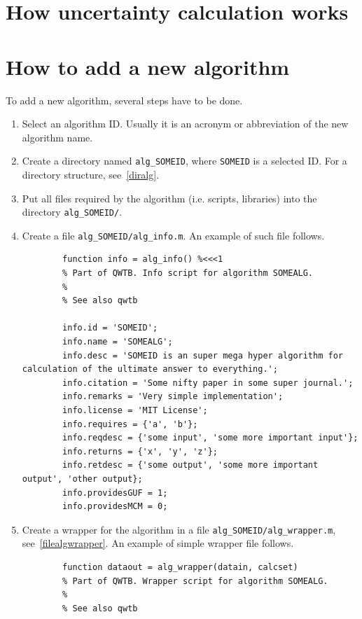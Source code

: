 \documentclass[12pt,a4paper,oneside]{report} %
\begin{document}
\section{How uncertainty calculation works} %

\section{How to add a new algorithm} %
To add a new algorithm, several steps have to be done.

\begin{enumerate}
        \item Select an algorithm ID. Usually it is an acronym or abbreviation of the new algorithm name.

        \item Create a directory named {\tt alg\_SOMEID}, where {\tt SOMEID} is a selected ID. For a
        directory structure, see~\ref{diralg}.

        \item Put all files required by the algorithm (i.e. scripts, libraries) into the directory
        {\tt alg\_SOMEID/}.

        \item Create a file {\tt alg\_SOMEID/alg\_info.m}. An example of such file follows.
        \begin{lstlisting}
        function info = alg_info() %<<<1
        % Part of QWTB. Info script for algorithm SOMEALG.
        %
        % See also qwtb

        info.id = 'SOMEID';
        info.name = 'SOMEALG';
        info.desc = 'SOMEID is an super mega hyper algorithm for calculation of the ultimate answer to everything.';
        info.citation = 'Some nifty paper in some super journal.';
        info.remarks = 'Very simple implementation';
        info.license = 'MIT License';
        info.requires = {'a', 'b'};
        info.reqdesc = {'some input', 'some more important input'};
        info.returns = {'x', 'y', 'z'};
        info.retdesc = {'some output', 'some more important output', 'other output};
        info.providesGUF = 1;
        info.providesMCM = 0;
        \end{lstlisting}

        \item Create a wrapper for the algorithm in a file {\tt alg\_SOMEID/alg\_wrapper.m}, see~\ref{filealgwrapper}. An example of simple wrapper
        file follows.
        \begin{lstlisting}
        function dataout = alg_wrapper(datain, calcset)
        % Part of QWTB. Wrapper script for algorithm SOMEALG.
        %
        % See also qwtb


\end{lstlisting}
\end{enumerate}
\end{document}

